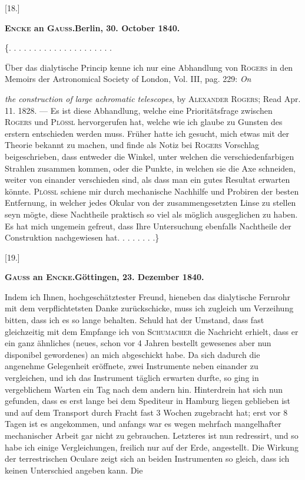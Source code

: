 \clearpage\begingroup
{}

\begin{center}
[18.]\par\medskip
\textbf{\textsc{Encke} an \textsc{Gauss}.\quad Berlin, 30. October 1840.}
\end{center}
\noindent \{. . . . . . . . . . . . . . . . . . . . .\par
\noindent\hspace*{\parindent}Über das dialytische Princip kenne ich nur eine Abhandlung von \textsc{Rogers} in den Memoirs der Astronomical Society of London, Vol. III, pag. 229: \textit{On}
\par\clearpage{}
\noindent\textit{the construction of large achromatic telescopes}, by \textsc{Alexander Rogers}; Read Apr. 11. 1828. --- Es ist diese Abhandlung, welche eine Prioritätsfrage zwischen \textsc{Rogers} und \textsc{Plössl} hervorgerufen hat, welche wie ich glaube zu Gunsten des erstern entschieden werden muss. Früher hatte ich gesucht, mich etwas mit der Theorie bekannt zu machen, und finde als Notiz bei \textsc{Rogers} Vorschlag beigeschrieben, dass entweder die Winkel, unter welchen die verschiedenfarbigen Strahlen zusammen kommen, oder die Punkte, in welchen sie die Axe schneiden, weiter von einander verschieden sind, als dass man ein gutes Resultat erwarten könnte. \textsc{Plössl} schiene mir durch mechanische Nachhilfe und Probiren der besten Entfernung, in welcher jedes Okular von der zusammengesetzten Linse zu stellen seyn mögte, diese Nachtheile praktisch so viel als möglich ausgeglichen zu haben. Es hat mich ungemein gefreut, dass Ihre Untersuchung ebenfalls Nachtheile der Construktion nachgewiesen hat. . . . . . . .\}
\begin{center}
[19.]\par\medskip
\textbf{\textsc{Gauss} an \textsc{Encke}.\quad Göttingen, 23. Dezember 1840.}
\end{center}
\noindent\hspace*{\parindent}Indem ich Ihnen, hochgeschätztester Freund, hieneben das dialytische Fernrohr mit dem verpflichtetsten Danke zurückschicke, muss ich zugleich um Verzeihung bitten, dass ich es so lange behalten. Schuld hat der Umstand, dass fast gleichzeitig mit dem Empfange ich von \textsc{Schumacher} die Nachricht erhielt, dass er ein ganz ähnliches (neues, schon vor 4 Jahren bestellt gewesenes aber nun disponibel gewordenes) an mich abgeschickt habe. Da sich dadurch die angenehme Gelegenheit eröffnete, zwei Instrumente neben einander zu vergleichen, und ich das Instrument täglich erwarten durfte, so ging in vergeblichem Warten ein Tag nach dem andern hin. Hinterdrein hat sich nun gefunden, dass es erst lange bei dem Spediteur in Hamburg liegen geblieben ist und auf dem Transport durch Fracht fast 3 Wochen zugebracht hat; erst vor 8 Tagen ist es angekommen, und anfangs war es wegen mehrfach mangelhafter mechanischer Arbeit gar nicht zu gebrauchen. Letzteres ist nun redressirt, und so habe ich einige Vergleichungen, freilich nur auf der Erde, angestellt. Die Wirkung der terrestrischen Oculare zeigt sich an beiden Instrumenten so gleich, dass ich keinen Unterschied angeben kann. Die
